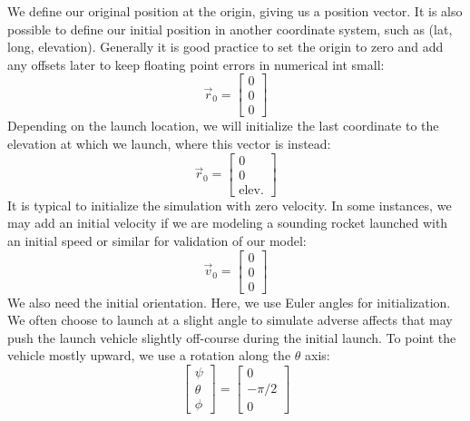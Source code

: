 \documentclass[10pt, openany, titlepage]{book}
\theoremstyle{definition}
\begin{document}
We define our original position at the origin, giving us a position vector. It is also possible to define our initial position in another coordinate system, such as (lat, long, elevation). Generally it is good practice to set the origin to zero and add any offsets later to keep floating point errors in \gls{numerical int} small:
$$\vec{r}_0=\begin{bmatrix}
    0\\0\\0
\end{bmatrix}$$
Depending on the launch location, we will initialize the last coordinate to the elevation at which we launch, where this vector is instead:
$$\vec{r}_0=\begin{bmatrix}
    0\\0\\\text{elev.}
\end{bmatrix}$$
It is typical to initialize the simulation with zero velocity. In some instances, we may add an initial velocity if we are modeling a sounding rocket launched with an initial speed or similar for validation of our model:
$$\vec{v}_0=\begin{bmatrix}
    0\\0\\0
\end{bmatrix}$$
We also need the initial orientation. Here, we use \gls{Euler angles} for initialization. We often choose to launch at a slight angle to simulate adverse affects that may push the launch vehicle slightly off-course during the initial launch. To point the vehicle mostly upward, we use a rotation along the $\theta$ axis:
\begin{equation}\label{eq: euler angles 6DoF}
    \begin{bmatrix}
    \psi\\\theta\\\phi
\end{bmatrix} =
\begin{bmatrix}
    0\\-\pi/2\\0
\end{bmatrix}
\end{equation}
\end{document}
